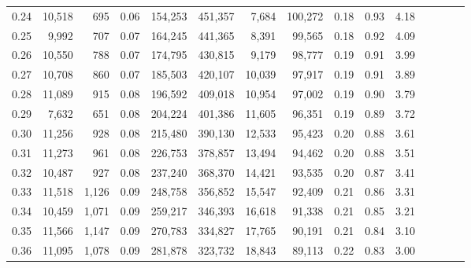 \begin{tabular}{rrrcrrrrrrrrrrr}
0.24 &  10,518 &    695 &                                       0.06 &  154,253 &  451,357 &    7,684 &  100,272 &  0.18 &  0.93 &                         4.18 \\
0.25 &   9,992 &    707 &                                       0.07 &  164,245 &  441,365 &    8,391 &   99,565 &  0.18 &  0.92 &                         4.09 \\
0.26 &  10,550 &    788 &                                       0.07 &  174,795 &  430,815 &    9,179 &   98,777 &  0.19 &  0.91 &                         3.99 \\
0.27 &  10,708 &    860 &                                       0.07 &  185,503 &  420,107 &   10,039 &   97,917 &  0.19 &  0.91 &                         3.89 \\
0.28 &  11,089 &    915 &                                       0.08 &  196,592 &  409,018 &   10,954 &   97,002 &  0.19 &  0.90 &                         3.79 \\
0.29 &   7,632 &    651 &                                       0.08 &  204,224 &  401,386 &   11,605 &   96,351 &  0.19 &  0.89 &                         3.72 \\
0.30 &  11,256 &    928 &                                       0.08 &  215,480 &  390,130 &   12,533 &   95,423 &  0.20 &  0.88 &                         3.61 \\
0.31 &  11,273 &    961 &                                       0.08 &  226,753 &  378,857 &   13,494 &   94,462 &  0.20 &  0.88 &                         3.51 \\
0.32 &  10,487 &    927 &                                       0.08 &  237,240 &  368,370 &   14,421 &   93,535 &  0.20 &  0.87 &                         3.41 \\
0.33 &  11,518 &  1,126 &                                       0.09 &  248,758 &  356,852 &   15,547 &   92,409 &  0.21 &  0.86 &                         3.31 \\
0.34 &  10,459 &  1,071 &                                       0.09 &  259,217 &  346,393 &   16,618 &   91,338 &  0.21 &  0.85 &                         3.21 \\
0.35 &  11,566 &  1,147 &                                       0.09 &  270,783 &  334,827 &   17,765 &   90,191 &  0.21 &  0.84 &                         3.10 \\
0.36 &  11,095 &  1,078 &                                       0.09 &  281,878 &  323,732 &   18,843 &   89,113 &  0.22 &  0.83 &                         3.00 \\

\end{tabular}

